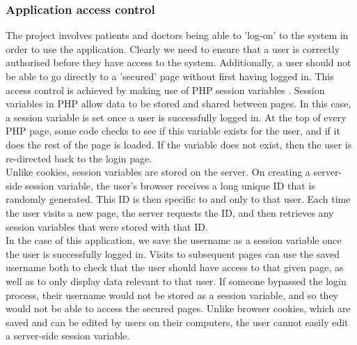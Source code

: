 \documentclass[11pt]{article}
\begin{document}
\subsubsection{Application access control} \label{phpsessions}
The project involves patients and doctors being able to 'log-on' to the system in order to use the application. Clearly we need to ensure that a user is correctly authorised before they have access to the system. Additionally, a user should not be able to go directly to a 'secured' page without first having logged in. This access control is achieved by making use of PHP session variables \cite{sessionvars:phpmanual}. Session variables in PHP allow data to be stored and shared between pages. In this case, a session variable is set once a user is successfully logged in. At the top of every PHP page, some code checks to see if this variable exists for the user, and if it does the rest of the page is loaded. If the variable does not exist, then the user is re-directed back to the login page.
\\ \indent
Unlike cookies, session variables are stored on the server. On creating a server-side session variable, the user's browser receives a long unique ID that is randomly generated. This ID is then specific to and only to that user. Each time the user visits a new page, the server requests the ID, and then retrieves any session variables that were stored with that ID. 
\\ \indent
In the case of this application, we save the username as a session variable once the user is successfully logged in. Visits to subsequent pages can use the saved username both to check that the user should have access to that given page, as well as to only display data relevant to that user. If someone bypassed the login process, their username would not be stored as a session variable, and so they would not be able to access the secured pages. Unlike browser cookies, which are saved and can be edited by users on their computers, the user cannot easily edit a server-side session variable.
\end{document}
